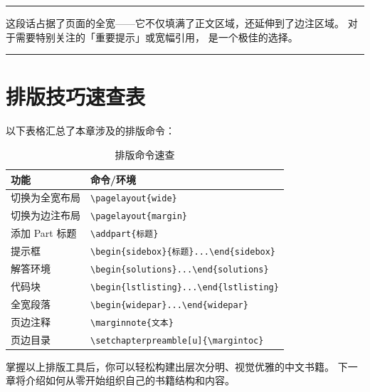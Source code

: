 \begin{widepar}
\noindent\color{chaptercolor}\rule{\textwidth+\marginparsep+\marginparwidth}{1pt}
\medskip

这段话占据了页面的全宽——它不仅填满了正文区域，还延伸到了边注区域。
对于需要特别关注的「重要提示」或宽幅引用， 是一个极佳的选择。

\medskip
\color{chaptercolor}\rule{\textwidth+\marginparsep+\marginparwidth}{1pt}
\end{widepar}


\section{排版技巧速查表}

以下表格汇总了本章涉及的排版命令：

\begin{table}[h]
\centering
\caption{排版命令速查}
\begin{tabular}{@{}ll@{}}
\toprule
功能 & 命令/环境 \\
\midrule
切换为全宽布局 & \lstinline|\pagelayout{wide}| \\
切换为边注布局 & \lstinline|\pagelayout{margin}| \\
添加 Part 标题 & \lstinline|\addpart{标题}| \\
提示框 & \lstinline|\begin{sidebox}{标题}...\end{sidebox}| \\
解答环境 & \lstinline|\begin{solutions}...\end{solutions}| \\
代码块 & \lstinline|\begin{lstlisting}...\end{lstlisting}| \\
全宽段落 & \lstinline|\begin{widepar}...\end{widepar}| \\
页边注释 & \lstinline|\marginnote{文本}| \\
页边目录 & \lstinline|\setchapterpreamble[u]{\margintoc}| \\
\bottomrule
\end{tabular}
\end{table}

掌握以上排版工具后，你可以轻松构建出层次分明、视觉优雅的中文书籍。
下一章将介绍如何从零开始组织自己的书籍结构和内容。
